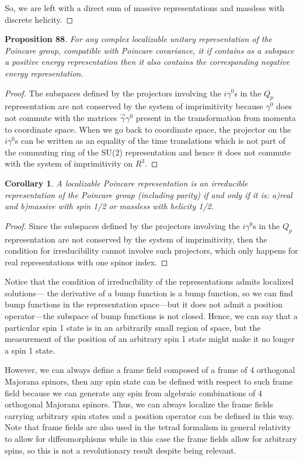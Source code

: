 \documentclass[11pt]{book}
\begin{document}
So, we are left with a direct sum of massive representations and
massless with discrete helicity.~◻

\textbf{Proposition 88}. \emph{For any complex localizable unitary
representation of the Poincare group, compatible with Poincare
covariance, it if contains as a subspace a positive energy
representation then it also contains the corresponding negative energy
representation.}

\emph{Proof.} The subspaces defined by the projectors involving the
\(i\gamma^0\)s in the \(Q_p\) representation are not conserved by the
system of imprimitivity because \(\gamma^0\) does not commute with the
matrices \(\vec{\gamma}\gamma^0\) present in the transformation from
momenta to coordinate space. When we go back to coordinate space, the
projector on the \(i\gamma^0\)s can be written as an equality of the
time translations which is not part of the commuting ring of the SU(2)
representation and hence it does not commute with the system of
imprimitivity on \(R^3\).~◻

\textbf{Corollary 1}. \emph{A localizable Poincare representation is an
irreducible representation of the Poincare group (including parity) if
and only if it is: a)real and b)massive with spin 1/2 or massless with
helicity 1/2.}

\emph{Proof.} Since the subspaces defined by the projectors involving
the \(i\gamma^0\)s in the \(Q_p\) representation are not conserved by
the system of imprimitivity, then the condition for irreducibility
cannot involve such projectors, which only happens for real
representations with one spinor index.~◻

Notice that the condition of irreducibility of the representations
admits localized solutions--- the derivative of a bump function is a
bump function, so we can find bump functions in the representation
space---but it does not admit a position operator---the subspace of bump
functions is not closed. Hence, we can say that a particular spin 1
state is in an arbitrarily small region of space, but the measurement of
the position of an arbitrary spin 1 state might make it no longer a spin
1 state.

However, we can always define a frame field composed of a frame of 4
orthogonal Majorana spinors, then any spin state can be defined with
respect to such frame field because we can generate any spin from
algebraic combinations of 4 orthogonal Majorana spinors. Thus, we can
always localize the frame fields carrying arbitrary spin states and a
position operator can be defined in this way. Note that frame fields are
also used in the tetrad formalism in general relativity to allow for
diffeomorphisms while in this case the frame fields allow for arbitrary
spins, so this is not a revolutionary result despite being relevant.
\end{document}
